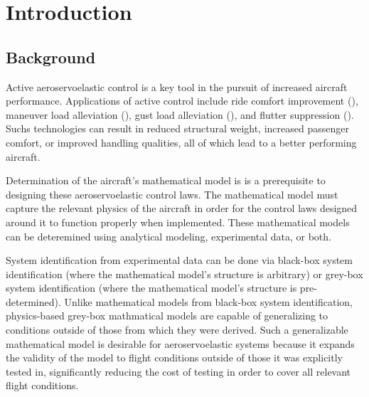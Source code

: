 \chapter{Introduction}
\label{ch:introduction}

%
%
%
%
%
%

\section{Background}

Active aeroservoelastic control is a key tool in the pursuit of increased aircraft performance. Applications of active control include ride comfort improvement (\cite{Jones1979}), maneuver load alleviation (\cite{Sensburg1982}), gust load alleviation (\cite{Nissim1976}), and flutter suppression (\cite{Livne2018}). Suchs technologies can result in reduced structural weight, increased passenger comfort, or improved handling qualities, all of which lead to a better performing aircraft.

Determination of the aircraft's mathematical model is  is a prerequisite to designing these aeroservoelastic control laws. The mathematical model must capture the relevant physics of the aircraft in order for the control laws designed around it to function properly when implemented. These mathematical models can be deteremined using analytical modeling, experimental data, or both.

System identification from experimental data can be done via black-box system identification (where the mathematical model's structure is arbitrary) or grey-box system identification (where the mathematical model's structure is pre-determined). Unlike mathematical models from black-box system identification, physics-based grey-box mathmatical models are capable of generalizing to conditions outside of those from which they were derived. Such a generalizable mathematical model is desirable for aeroservoelastic systems because it expands the validity of the model to flight conditions outside of those it was explicitly tested in, significantly reducing the cost of testing in order to cover all relevant flight conditions.

